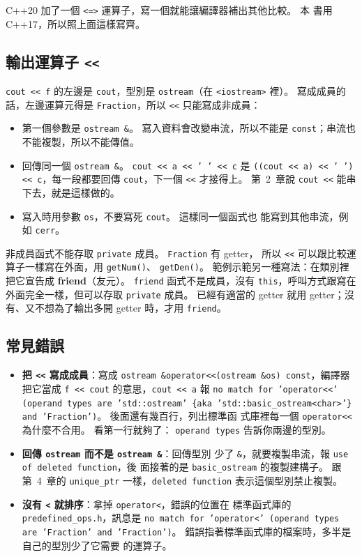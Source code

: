 C++20 加了一個 \texttt{<=>} 運算子，寫一個就能讓編譯器補出其他比較。 本
書用 C++17，所以照上面這樣寫齊。

\subsection{輸出運算子 \texttt{<<}}

\texttt{cout << f} 的左邊是 \texttt{cout}，型別是 \texttt{ostream}（在
\texttt{<iostream>} 裡）。 寫成成員的話，左邊運算元得是
\texttt{Fraction}，所以 \texttt{<<} 只能寫成非成員：

\begin{itemize}
\item 第一個參數是 \texttt{ostream \&}。 寫入資料會改變串流，所以不能是
\texttt{const}；串流也不能複製，所以不能傳值。
\item 回傳同一個 \texttt{ostream \&}。 \texttt{cout << a << ' ' << c} 是
\texttt{((cout << a) << ' ') << c}，每一段都要回傳 \texttt{cout}，下一個
\texttt{<<} 才接得上。 第~2~章說 \texttt{cout <<} 能串下去，就是這樣做的。
\item 寫入時用參數 \texttt{os}，不要寫死 \texttt{cout}。 這樣同一個函式也
能寫到其他串流，例如 \texttt{cerr}。
\end{itemize}

非成員函式不能存取 \texttt{private} 成員。 \texttt{Fraction} 有 getter，
所以 \texttt{<<} 可以跟比較運算子一樣寫在外面，用 \texttt{getNum()}、
\texttt{getDen()}。 範例示範另一種寫法：在類別裡把它宣告成
\textbf{friend}（友元）。 \texttt{friend} 函式不是成員，沒有
\texttt{this}，呼叫方式跟寫在外面完全一樣，但可以存取 \texttt{private}
成員。 已經有適當的 getter 就用 getter；沒有、又不想為了輸出多開
getter 時，才用 \texttt{friend}。

\subsection{常見錯誤}

\begin{itemize}
\item \textbf{把 \texttt{<<} 寫成成員}：寫成
\texttt{ostream \&operator<<(ostream \&os) const}，編譯器把它當成
\texttt{f << cout} 的意思，\texttt{cout << a} 報 \texttt{no match for
'operator<<' (operand types are 'std::ostream' \{aka
'std::basic\_ostream<char>'\} and 'Fraction')}。 後面還有幾百行，列出標準函
式庫裡每一個 \texttt{operator<<} 為什麼不合用。 看第一行就夠了：
\texttt{operand types} 告訴你兩邊的型別。
\item \textbf{回傳 \texttt{ostream} 而不是 \texttt{ostream \&}}：回傳型別
少了 \texttt{\&}，就要複製串流，報 \texttt{use of deleted function}，後
面接著的是 \texttt{basic\_ostream} 的複製建構子。 跟第~4~章的
\texttt{unique\_ptr} 一樣，\texttt{deleted function} 表示這個型別禁止複製。
\item \textbf{沒有 \texttt{<} 就排序}：拿掉 \texttt{operator<}，錯誤的位置在
標準函式庫的 \texttt{predefined\_ops.h}，訊息是
\texttt{no match for 'operator<' (operand types are 'Fraction' and
'Fraction')}。 錯誤指著標準函式庫的檔案時，多半是自己的型別少了它需要
的運算子。
\end{itemize}

